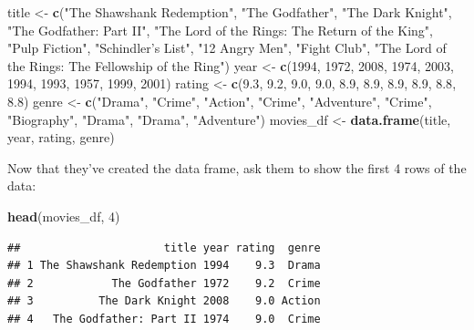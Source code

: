 \documentclass[]{book}
\newenvironment{Shaded}{\begin{snugshade}}{\end{snugshade}}
\newcommand{\DecValTok}[1]{\textcolor[rgb]{0.00,0.00,0.81}{#1}}
\newcommand{\FloatTok}[1]{\textcolor[rgb]{0.00,0.00,0.81}{#1}}
\newcommand{\KeywordTok}[1]{\textcolor[rgb]{0.13,0.29,0.53}{\textbf{#1}}}
\newcommand{\NormalTok}[1]{#1}
\newcommand{\StringTok}[1]{\textcolor[rgb]{0.31,0.60,0.02}{#1}}
\begin{document}
\begin{Shaded}
\begin{Highlighting}[]
\NormalTok{title <-}\StringTok{ }\KeywordTok{c}\NormalTok{(}\StringTok{"The Shawshank Redemption"}\NormalTok{, }\StringTok{"The Godfather"}\NormalTok{, }\StringTok{"The Dark Knight"}\NormalTok{, }\StringTok{"The Godfather: Part II"}\NormalTok{,}
                \StringTok{"The Lord of the Rings: The Return of the King"}\NormalTok{, }\StringTok{"Pulp Fiction"}\NormalTok{, }\StringTok{"Schindler's List"}\NormalTok{,}
                \StringTok{"12 Angry Men"}\NormalTok{, }\StringTok{"Fight Club"}\NormalTok{, }\StringTok{"The Lord of the Rings: The Fellowship of the Ring"}\NormalTok{)}
\NormalTok{year <-}\StringTok{ }\KeywordTok{c}\NormalTok{(}\DecValTok{1994}\NormalTok{, }\DecValTok{1972}\NormalTok{, }\DecValTok{2008}\NormalTok{, }\DecValTok{1974}\NormalTok{, }\DecValTok{2003}\NormalTok{, }\DecValTok{1994}\NormalTok{, }\DecValTok{1993}\NormalTok{, }\DecValTok{1957}\NormalTok{, }\DecValTok{1999}\NormalTok{, }\DecValTok{2001}\NormalTok{)}
\NormalTok{rating <-}\StringTok{ }\KeywordTok{c}\NormalTok{(}\FloatTok{9.3}\NormalTok{, }\FloatTok{9.2}\NormalTok{, }\FloatTok{9.0}\NormalTok{, }\FloatTok{9.0}\NormalTok{, }\FloatTok{8.9}\NormalTok{, }\FloatTok{8.9}\NormalTok{, }\FloatTok{8.9}\NormalTok{, }\FloatTok{8.9}\NormalTok{, }\FloatTok{8.8}\NormalTok{, }\FloatTok{8.8}\NormalTok{)}
\NormalTok{genre <-}\StringTok{ }\KeywordTok{c}\NormalTok{(}\StringTok{"Drama"}\NormalTok{, }\StringTok{"Crime"}\NormalTok{, }\StringTok{"Action"}\NormalTok{, }\StringTok{"Crime"}\NormalTok{, }\StringTok{"Adventure"}\NormalTok{, }\StringTok{"Crime"}\NormalTok{, }\StringTok{"Biography"}\NormalTok{, }\StringTok{"Drama"}\NormalTok{, }\StringTok{"Drama"}\NormalTok{, }\StringTok{"Adventure"}\NormalTok{)}
\NormalTok{movies_df <-}\StringTok{ }\KeywordTok{data.frame}\NormalTok{(title, year, rating, genre)}
\end{Highlighting}
\end{Shaded}

Now that they've created the data frame, ask them to show the first 4 rows of the data:

\begin{Shaded}
\begin{Highlighting}[]
\KeywordTok{head}\NormalTok{(movies_df, }\DecValTok{4}\NormalTok{)}
\end{Highlighting}
\end{Shaded}

\begin{verbatim}
##                      title year rating  genre
## 1 The Shawshank Redemption 1994    9.3  Drama
## 2            The Godfather 1972    9.2  Crime
## 3          The Dark Knight 2008    9.0 Action
## 4   The Godfather: Part II 1974    9.0  Crime
\end{verbatim}
\end{document}
